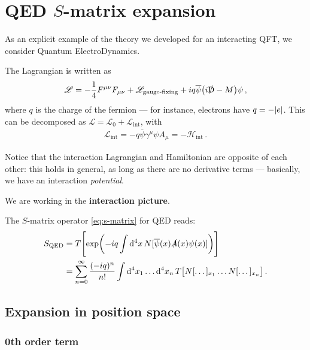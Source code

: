 \documentclass[main.tex]{subfiles}
\begin{document}
\section{QED \(S\)-matrix expansion}


As an explicit example of the theory we developed for an interacting QFT, we consider Quantum ElectroDynamics.

The Lagrangian is written as 
%
\begin{align}
\mathscr{L} = 
- \frac{1}{4} F^{\mu \nu } F_{\mu \nu }
+ \mathscr{L} _{\text{gauge-fixing}}
+ i q \overline{\psi} \qty(i\slashed{\mathrm{D}} - M) \psi  
\,,
\end{align}
%
where \(q\) is the charge of the fermion --- for instance, electrons have \(q = - \abs{e}\). 
This can be decomposed as \(\mathscr{L} = \mathscr{L}_{0} + \mathscr{L} _{\text{int}}\), with 
%
\begin{align}
\mathscr{L} _{\text{int}} = - q \overline{\psi} \gamma^{\mu } \psi A_{\mu } = - \mathscr{H} _{\text{int}}
\,.
\end{align}

Notice that the interaction Lagrangian and Hamiltonian are opposite of each other: this holds in general, as long as there are no derivative terms --- basically, we have an interaction \emph{potential}. 

We are working in the \textbf{interaction picture}. 

The \(S\)-matrix operator \eqref{eq:s-matrix} for QED reads: 
%
\begin{align}
S _{\text{QED}}
&= T \qty[\exp(-iq \int \dd[4]{x} N [\overline{\psi}(x) \slashed{A} (x) \psi (x)])]  \\
&= \sum _{n=0}^{ \infty }
\frac{(-iq)^{n}}{n!}
\int \dd[4]{x_1 } \dots \dd[4]{x_{n}}
T \qty[N[\dots]_{x_1} \dots N[\dots]_{x_n}]
\,.
\end{align}

\subsection{Expansion in position space}

\subsubsection{0th order term}
\end{document}
